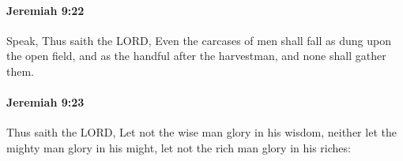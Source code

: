 		\paragraph{Jeremiah 9:22} %
			\label{JEREMIAH-9-22}

			Speak, Thus saith the LORD, Even the carcases of men shall fall as dung upon the open field, and as the handful after the harvestman, and none shall gather them.


		\paragraph{Jeremiah 9:23} %
			\label{JEREMIAH-9-23}

			Thus saith the LORD, Let not the wise man glory in his wisdom, neither let the mighty man glory in his might, let not the rich man glory in his riches:


